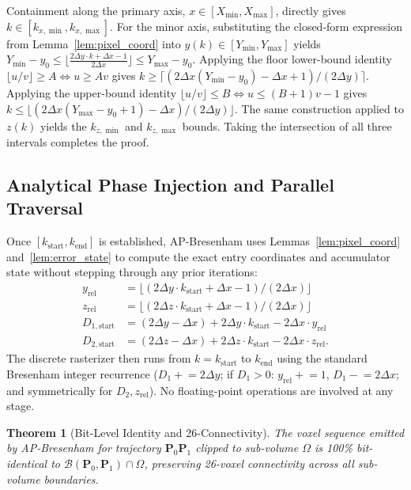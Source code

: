 \documentclass[conference]{IEEEtran}
\newtheorem{theorem}{Theorem}
\begin{document}
\begin{IEEEproof}
Containment along the primary axis, $x \in [X_{\min}, X_{\max}]$, directly gives $k \in [k_{x,\min}, k_{x,\max}]$. For the minor axis, substituting the closed-form expression from Lemma~\ref{lem:pixel_coord} into $y(k) \in [Y_{\min}, Y_{\max}]$ yields
$Y_{\min} - y_0 \le \lfloor \frac{2\Delta y \cdot k + \Delta x - 1}{2\Delta x} \rfloor \le Y_{\max} - y_0$.
Applying the floor lower-bound identity $\lfloor u/v \rfloor \ge A \iff u \ge Av$ gives $k \ge \lceil (2\Delta x (Y_{\min} - y_0) - \Delta x + 1) / (2\Delta y) \rceil$. Applying the upper-bound identity $\lfloor u/v \rfloor \le B \iff u \le (B+1)v - 1$ gives $k \le \lfloor (2\Delta x (Y_{\max} - y_0 + 1) - \Delta x) / (2\Delta y) \rfloor$. The same construction applied to $z(k)$ yields the $k_{z,\min}$ and $k_{z,\max}$ bounds. Taking the intersection of all three intervals completes the proof.
\end{IEEEproof}

\subsection{Analytical Phase Injection and Parallel Traversal}
Once $[k_{\mathrm{start}}, k_{\mathrm{end}}]$ is established, AP-Bresenham uses Lemmas~\ref{lem:pixel_coord} and~\ref{lem:error_state} to compute the exact entry coordinates and accumulator state without stepping through any prior iterations:
\begin{align}
    y_{\mathrm{rel}} &= \lfloor (2\Delta y \cdot k_{\mathrm{start}} + \Delta x - 1) / (2\Delta x) \rfloor \\
    z_{\mathrm{rel}} &= \lfloor (2\Delta z \cdot k_{\mathrm{start}} + \Delta x - 1) / (2\Delta x) \rfloor \\
    D_{1,\mathrm{start}} &= (2\Delta y - \Delta x) + 2\Delta y \cdot k_{\mathrm{start}} - 2\Delta x \cdot y_{\mathrm{rel}} \\
    D_{2,\mathrm{start}} &= (2\Delta z - \Delta x) + 2\Delta z \cdot k_{\mathrm{start}} - 2\Delta x \cdot z_{\mathrm{rel}}.
\end{align}
The discrete rasterizer then runs from $k = k_{\mathrm{start}}$ to $k_{\mathrm{end}}$ using the standard Bresenham integer recurrence ($D_1 \mathrel{+}= 2\Delta y$; if $D_1 > 0$: $y_{\mathrm{rel}} \mathrel{+}= 1$, $D_1 \mathrel{-}= 2\Delta x$; and symmetrically for $D_2, z_{\mathrm{rel}}$). No floating-point operations are involved at any stage.

\begin{theorem}[Bit-Level Identity and 26-Connectivity]
\label{thm:bit_identity}
The voxel sequence emitted by AP-Bresenham for trajectory $\mathbf{P}_0\mathbf{P}_1$ clipped to sub-volume $\Omega$ is 100\% bit-identical to $\mathcal{B}(\mathbf{P}_0, \mathbf{P}_1) \cap \Omega$, preserving 26-voxel connectivity across all sub-volume boundaries.
\end{theorem}
\end{document}
